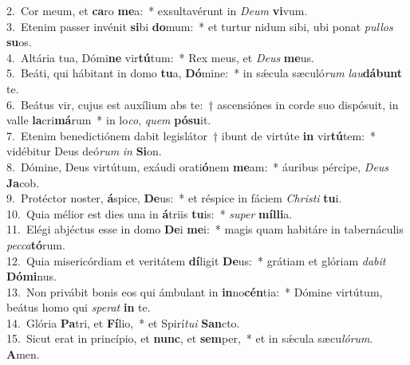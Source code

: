 {2.~}Cor meum, et \textbf{ca}ro \textbf{me}a:~* exsultavérunt in \textit{De}\textit{um} \textbf{vi}vum.\\
{3.~}Etenim passer invénit \textbf{si}bi \textbf{do}mum:~* et turtur nidum sibi, ubi ponat \textit{pul}\textit{los} \textbf{su}os.\\
{4.~}Altária tua, Dómi\textbf{ne} vir\textbf{tú}tum:~* Rex meus, et \textit{De}\textit{us} \textbf{me}us.\\
{5.~}Beáti, qui hábitant in domo \textbf{tu}a, \textbf{Dó}mine:~* in sǽcula sæculó\textit{rum} \textit{lau}\textbf{dá}\textbf{bunt} te.\\
{6.~}Beátus vir, cujus est auxílium abs te:~† ascensiónes in corde suo dispósuit, in valle \textbf{la}cri\textbf{má}rum~* in lo\textit{co}, \textit{quem} \textbf{pó}\textbf{su}it.\\
{7.~}Etenim benedictiónem dabit legislátor~† ibunt de virtúte \textbf{in} vir\textbf{tú}tem:~* vidébitur Deus deó\textit{rum} \textit{in} \textbf{Si}on.\\
{8.~}Dómine, Deus virtútum, exáudi orati\textbf{ó}nem \textbf{me}am:~* áuribus pércipe, \textit{De}\textit{us} \textbf{Ja}cob.\\
{9.~}Protéctor noster, \textbf{á}spice, \textbf{De}us:~* et réspice in fáciem \textit{Chri}\textit{sti} \textbf{tu}i.\\
{10.~}Quia mélior est dies una in \textbf{á}triis \textbf{tu}is:~* \textit{su}\textit{per} \textbf{míl}\textbf{li}a.\\
{11.~}Elégi abjéctus esse in domo \textbf{De}i \textbf{me}i:~* magis quam habitáre in tabernáculis \textit{pec}\textit{ca}\textbf{tó}rum.\\
{12.~}Quia misericórdiam et veritátem \textbf{dí}ligit \textbf{De}us:~* grátiam et glóriam \textit{da}\textit{bit} \textbf{Dó}\textbf{mi}nus.\\
{13.~}Non privábit bonis eos qui ámbulant in \textbf{in}no\textbf{cén}tia:~* Dómine virtútum, beátus homo qui \textit{spe}\textit{rat} \textbf{in} te.\\
{14.~}Glória \textbf{Pa}tri, et \textbf{Fí}lio,~* et Spirí\textit{tu}\textit{i} \textbf{San}cto.\\
{15.~}Sicut erat in princípio, et \textbf{nunc}, et \textbf{sem}per,~* et in sǽcula sæcu\textit{ló}\textit{rum}. \textbf{A}men.\\
